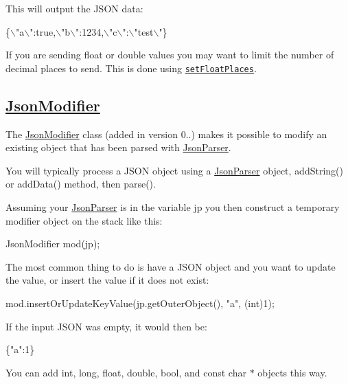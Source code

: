 This will output the J\+S\+ON data\+:


\begin{DoxyCode}
\{\(\backslash\)"a\(\backslash\)":true,\(\backslash\)"b\(\backslash\)":1234,\(\backslash\)"c\(\backslash\)":\(\backslash\)"test\(\backslash\)"\}
\end{DoxyCode}


If you are sending float or double values you may want to limit the number of decimal places to send. This is done using \href{http://rickkas7.github.io/JsonParserGeneratorRK/class_json_writer.html#aecd4d984a49fe59b0c4d892fe6d1e791}{\tt set\+Float\+Places}.

\subsection*{\hyperlink{class_json_modifier}{Json\+Modifier}}

The \hyperlink{class_json_modifier}{Json\+Modifier} class (added in version 0..) makes it possible to modify an existing object that has been parsed with \hyperlink{class_json_parser}{Json\+Parser}.

You will typically process a J\+S\+ON object using a {\ttfamily \hyperlink{class_json_parser}{Json\+Parser}} object, {\ttfamily add\+String()} or {\ttfamily add\+Data()} method, then {\ttfamily parse()}.

Assuming your {\ttfamily \hyperlink{class_json_parser}{Json\+Parser}} is in the variable {\ttfamily jp} you then construct a temporary modifier object on the stack like this\+:


\begin{DoxyCode}
JsonModifier mod(jp);
\end{DoxyCode}


The most common thing to do is have a J\+S\+ON object and you want to update the value, or insert the value if it does not exist\+:


\begin{DoxyCode}
mod.insertOrUpdateKeyValue(jp.getOuterObject(), "a", (int)1);
\end{DoxyCode}


If the input J\+S\+ON was empty, it would then be\+:


\begin{DoxyCode}
\{"a":1\}
\end{DoxyCode}


You can add int, long, float, double, bool, and const char $\ast$ objects this way.


